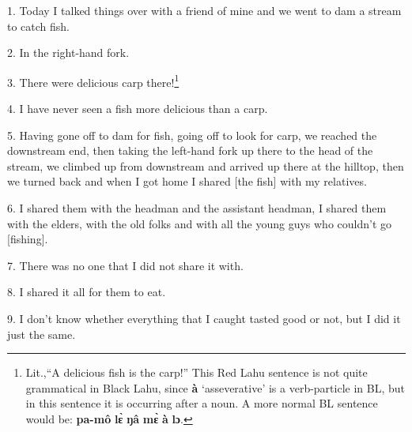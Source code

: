 \setcounter{footnote}{0}

1. Today I talked things over with a friend of mine and we went to dam a stream
to catch fish.

2. In the right-hand fork.

3. There were delicious carp there!\footnote{Lit.,``A delicious fish is the carp!'' This Red Lahu sentence is not quite grammatical in Black Lahu, since \textbf{à} `asseverative' is a verb-particle in BL, but in this sentence it is occurring after a noun. A more normal BL sentence would be: \textbf{pa-mô} \textbf{lɛ̀} \textbf{ŋâ} \textbf{mɛ̀} \textbf{à} \textbf{lɔ}.}

4. I have never seen a fish more delicious than a carp.

5. Having gone off to dam for fish, going off to look for carp, we reached the downstream
end, then taking the left-hand fork up there to the head of the stream, we climbed
up from downstream and arrived up there at the hilltop, then we turned back and
when I got home I shared [the fish] with my relatives.

6. I shared them with the headman and the assistant headman, I shared them with
the elders, with the old folks and with all the young guys who couldn't go [fishing].

7. There was no one that I did not share it with.

8. I shared it all for them to eat.

9. I don't know whether everything that I caught tasted good or not, but I did it
just the same.

